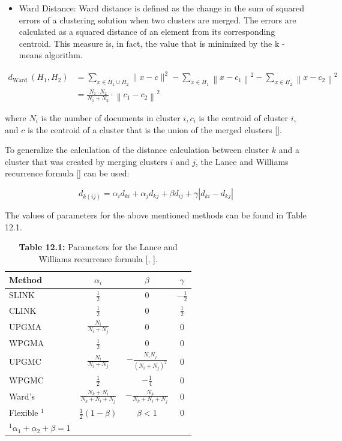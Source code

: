 \begin{itemize}
  \item Ward Distance: Ward distance is defined as the change in the sum of squared errors of a clustering solution when two clusters are merged. The errors are calculated as a squared distance of an element from its corresponding centroid. This measure is, in fact, the value that is minimized by the k -means algorithm.
\end{itemize}


\begin{align*}
d_{\text {Ward }}\left(H_{1}, H_{2}\right) & =\sum_{x \in H_{1} \cup H_{2}}\|x-c\|^{2}-\sum_{x \in H_{1}}\left\|x-c_{1}\right\|^{2}-\sum_{x \in H_{2}}\left\|x-c_{2}\right\|^{2} \\
& =\frac{N_{1} \cdot N_{2}}{N_{1}+N_{2}} \cdot\left\|c_{1}-c_{2}\right\|^{2} \tag{12.35}
\end{align*}


where $N_{i}$ is the number of documents in cluster $i, c_{i}$ is the centroid of cluster $i$, and $c$ is the centroid of a cluster that is the union of the merged clusters [\cite{ref198}].

To generalize the calculation of the distance calculation between cluster $k$ and a cluster that was created by merging clusters $i$ and $j$, the Lance and Williams recurrence formula [\cite{ref81}] can be used:


\begin{equation*}
d_{k(i j)}=\alpha_{i} d_{k i}+\alpha_{j} d_{k j}+\beta d_{i j}+\gamma\left|d_{k i}-d_{k j}\right| \tag{12.36}
\end{equation*}


The values of parameters for the above mentioned methods can be found in Table 12.1.

\begin{table}[h]
\begin{center}
\captionsetup{labelformat=empty}
\caption{\textbf{Table 12.1:} Parameters for the Lance and Williams recurrence formula [\cite{ref81}, \cite{ref246}].}
\begin{tabular}{lccc}
\hline
Method & $\alpha_{i}$ & $\beta$ & $\gamma$ \\
\hline
SLINK & $\frac{1}{2}$ & 0 & $-\frac{1}{2}$ \\
CLINK & $\frac{1}{2}$ & 0 & $\frac{1}{2}$ \\
UPGMA & $\frac{N_{i}}{N_{i}+N_{j}}$ & 0 & 0 \\
WPGMA & $\frac{1}{2}$ & 0 & 0 \\
UPGMC & $\frac{N_{i}}{N_{i}+N_{j}}$ & $-\frac{N_{i} N_{j}}{\left(N_{i}+N_{j}\right)^{2}}$ & 0 \\
WPGMC & $\frac{1}{2}$ & $-\frac{1}{4}$ & 0 \\
Ward's & $\frac{N_{k}+N_{i}}{N_{k}+N_{i}+N_{j}}$ & $-\frac{N_{k}}{N_{k}+N_{i}+N_{j}}$ & 0 \\
Flexible $^{1}$ & $\frac{1}{2}(1-\beta)$ & $\beta<1$ & 0 \\
\hline
${ }^{1} \alpha_{1}+\alpha_{2}+\beta=1$
\end{tabular}
\end{center}
\label{table12.1}
\end{table}

